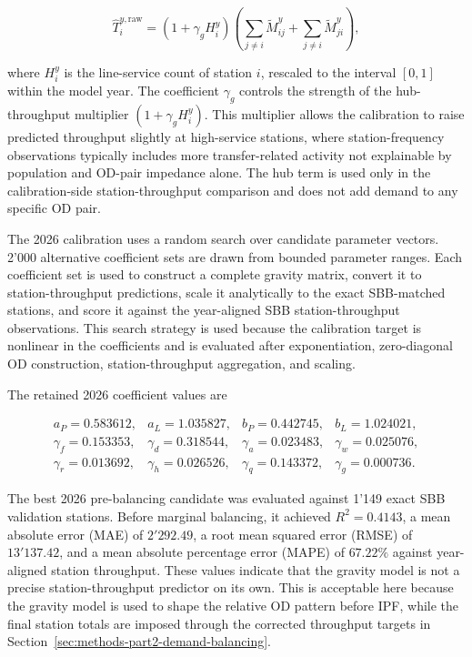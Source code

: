 \documentclass[preprint,12pt]{elsarticle}
\begin{document}
\begin{equation}
\widehat T_i^{y,\mathrm{raw}}
=
\left(1+\gamma_g H_i^y\right)
\left(
\sum_{j\ne i}\widetilde M^y_{ij}
+
\sum_{j\ne i}\widetilde M^y_{ji}
\right),
\label{eq:part2-gravity-throughput-proxy}
\end{equation}

where \(H_i^y\) is the line-service count of station \(i\), rescaled to the interval \([0,1]\) within the model year. The coefficient \(\gamma_g\) controls the strength of the hub-throughput multiplier \((1+\gamma_g H_i^y)\). This multiplier allows the calibration to raise predicted throughput slightly at high-service stations, where station-frequency observations typically includes more transfer-related activity not explainable by population and OD-pair impedance alone. The hub term is used only in the calibration-side station-throughput comparison and does not add demand to any specific OD pair.

The 2026 calibration uses a random search over candidate parameter vectors. 2'000 alternative coefficient sets are drawn from bounded parameter ranges. Each coefficient set is used to construct a complete gravity matrix, convert it to station-throughput predictions, scale it analytically to the exact SBB-matched stations, and score it against the year-aligned SBB station-throughput observations. This search strategy is used because the calibration target is nonlinear in the coefficients and is evaluated after exponentiation, zero-diagonal OD construction, station-throughput aggregation, and scaling.

The retained 2026 coefficient values are

\begin{equation}
\begin{array}{llll}
 a_P=0.583612, & a_L=1.035827, & b_P=0.442745, & b_L=1.024021,\\
 \gamma_f=0.153353, & \gamma_d=0.318544, & \gamma_a=0.023483, & \gamma_w=0.025076,\\
 \gamma_r=0.013692, & \gamma_h=0.026526, & \gamma_q=0.143372, & \gamma_g=0.000736.
\end{array}
\label{eq:part2-gravity-coefficients}
\end{equation}

The best 2026 pre-balancing candidate was evaluated against 1'149 exact SBB validation stations. Before marginal balancing, it achieved \(R^2=0.4143\), a mean absolute error (MAE) of \(2'292.49\), a root mean squared error (RMSE) of \(13'137.42\), and a mean absolute percentage error (MAPE) of \(67.22\%\) against year-aligned station throughput. These values indicate that the gravity model is not a precise station-throughput predictor on its own. This is acceptable here because the gravity model is used to shape the relative OD pattern before IPF, while the final station totals are imposed through the corrected throughput targets in Section~\ref{sec:methods-part2-demand-balancing}.
\end{document}
